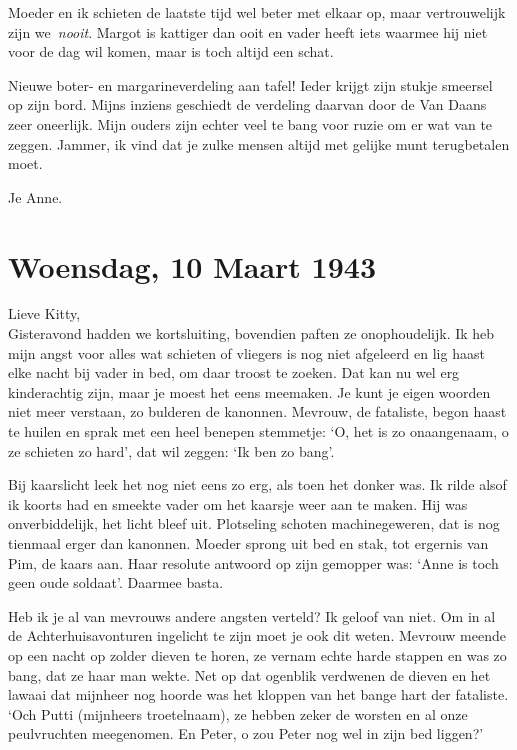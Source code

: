 \documentclass{book}
\begin{document}
Moeder en ik schieten de laatste tijd wel beter met elkaar op, maar
vertrouwelijk zijn we~\emph{nooit}. Margot is kattiger dan ooit en vader heeft
iets waarmee hij niet voor de dag wil komen, maar is toch altijd een schat.

Nieuwe boter- en margarineverdeling aan tafel! Ieder krijgt zijn stukje smeersel
op zijn bord. Mijns inziens geschiedt de verdeling daarvan door de Van Daans
zeer oneerlijk. Mijn ouders zijn echter veel te bang voor ruzie om er wat van te
zeggen. Jammer, ik vind dat je zulke mensen altijd met gelijke munt terugbetalen
moet.

Je Anne.

\section*{Woensdag, 10 Maart 1943}

Lieve Kitty,\\
Gisteravond hadden we kortsluiting, bovendien paften ze
onophoudelijk. Ik heb mijn angst voor alles wat schieten of vliegers is nog niet
afgeleerd en lig haast elke nacht bij vader in bed, om daar troost te zoeken.
Dat kan nu wel erg kinderachtig zijn, maar je moest het eens meemaken. Je kunt
je eigen woorden niet meer verstaan, zo bulderen de kanonnen. Mevrouw, de
fataliste, begon haast te huilen en sprak met een heel benepen stemmetje: `O,
het is zo onaangenaam, o ze schieten zo hard', dat wil zeggen: `Ik ben zo bang'.

Bij kaarslicht leek het nog niet eens zo erg, als toen het donker was.  Ik rilde
alsof ik koorts had en smeekte vader om het kaarsje weer aan te maken. Hij was
onverbiddelijk, het licht bleef uit. Plotseling schoten machinegeweren, dat is
nog tienmaal erger dan kanonnen. Moeder sprong uit bed en stak, tot ergernis van
Pim, de kaars aan. Haar resolute antwoord op zijn gemopper was: `Anne is toch
geen oude soldaat'. Daarmee basta.

Heb ik je al van mevrouws andere angsten verteld? Ik geloof van niet. Om in al
de Achterhuisavonturen ingelicht te zijn moet je ook dit weten.  Mevrouw meende
op een nacht op zolder dieven te horen, ze vernam echte harde stappen en was zo
bang, dat ze haar man wekte. Net op dat ogenblik verdwenen de dieven en het
lawaai dat mijnheer nog hoorde was het kloppen van het bange hart der fataliste.
`Och Putti (mijnheers troetelnaam), ze hebben zeker de worsten en al onze
peulvruchten meegenomen. En Peter, o zou Peter nog wel in zijn bed liggen?'
\end{document}
